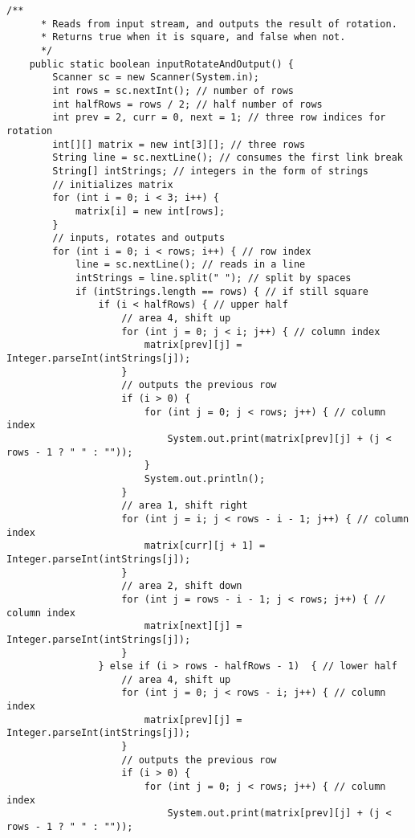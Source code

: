 \begin{lstlisting}[title={<Input Rotate and Output 31>}, label=Listing31]
    /**
      * Reads from input stream, and outputs the result of rotation.
      * Returns true when it is square, and false when not.
      */
    public static boolean inputRotateAndOutput() {
        Scanner sc = new Scanner(System.in);
        int rows = sc.nextInt(); // number of rows
        int halfRows = rows / 2; // half number of rows
        int prev = 2, curr = 0, next = 1; // three row indices for rotation
        int[][] matrix = new int[3][]; // three rows
        String line = sc.nextLine(); // consumes the first link break
        String[] intStrings; // integers in the form of strings
        // initializes matrix
        for (int i = 0; i < 3; i++) {
            matrix[i] = new int[rows];
        }
        // inputs, rotates and outputs 
        for (int i = 0; i < rows; i++) { // row index
            line = sc.nextLine(); // reads in a line
            intStrings = line.split(" "); // split by spaces
            if (intStrings.length == rows) { // if still square
                if (i < halfRows) { // upper half
                    // area 4, shift up
                    for (int j = 0; j < i; j++) { // column index
                        matrix[prev][j] = Integer.parseInt(intStrings[j]);
                    }
                    // outputs the previous row
                    if (i > 0) {
                        for (int j = 0; j < rows; j++) { // column index
                            System.out.print(matrix[prev][j] + (j < rows - 1 ? " " : ""));                
                        }
                        System.out.println();
                    }
                    // area 1, shift right
                    for (int j = i; j < rows - i - 1; j++) { // column index
                        matrix[curr][j + 1] = Integer.parseInt(intStrings[j]);
                    }
                    // area 2, shift down
                    for (int j = rows - i - 1; j < rows; j++) { // column index
                        matrix[next][j] = Integer.parseInt(intStrings[j]);
                    }
                } else if (i > rows - halfRows - 1)  { // lower half
                    // area 4, shift up
                    for (int j = 0; j < rows - i; j++) { // column index
                        matrix[prev][j] = Integer.parseInt(intStrings[j]);
                    }
                    // outputs the previous row
                    if (i > 0) {
                        for (int j = 0; j < rows; j++) { // column index
                            System.out.print(matrix[prev][j] + (j < rows - 1 ? " " : ""));                

\end{lstlisting}

